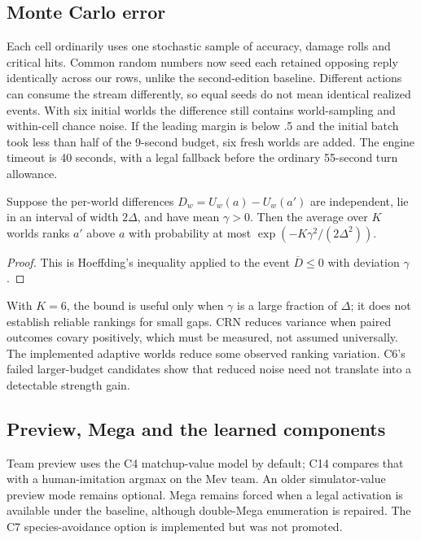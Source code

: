 
\subsection{Monte Carlo error}
Each cell ordinarily uses one stochastic sample of accuracy, damage rolls
and critical hits. Common random numbers now seed each retained opposing
reply identically across our rows, unlike the second-edition baseline.
Different actions can consume the stream differently, so equal seeds do not
mean identical realized events. With six initial worlds the difference still
contains world-sampling and within-cell chance noise. If the leading margin
is below .5 and the initial batch took less than half of the 9-second budget,
six fresh worlds are added. The engine timeout is 40 seconds, with a legal
fallback before the ordinary 55-second turn allowance.

\begin{proposition}
\label{prop:mc}
Suppose the per-world differences $D_w=U_w(a)-U_w(a')$ are independent, lie in
an interval of width $2\Delta$, and have mean $\gamma>0$. Then the average
over $K$ worlds ranks $a'$ above $a$ with probability at most
$\exp(-K\gamma^2/(2\Delta^2))$.
\end{proposition}
\begin{proof}
This is Hoeffding's inequality applied to the event $\overline D\le0$ with
deviation $\gamma$ \citep{hoeffding}.
\end{proof}

With $K=6$, the bound is useful only when $\gamma$ is a large fraction of
$\Delta$; it does not establish reliable rankings for small gaps. CRN reduces
variance when paired outcomes covary positively, which must be measured, not
assumed universally. The implemented adaptive worlds reduce some observed
ranking variation. C6's failed larger-budget candidates show that reduced
noise need not translate into a detectable strength gain.

\subsection{Preview, Mega and the learned components}
Team preview uses the C4 matchup-value model by default; C14 compares that
with a human-imitation argmax on the Mev team. An older simulator-value
preview mode remains optional. Mega remains forced when a legal activation
is available under the baseline, although double-Mega enumeration is repaired.
The C7 species-avoidance option is implemented but was not promoted.

